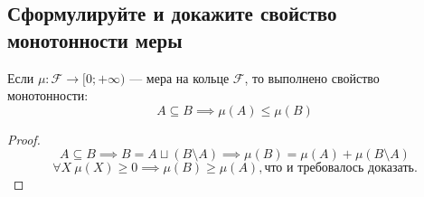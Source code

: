 
\subsection{Сформулируйте и докажите свойство монотонности меры}

Если $\mu : \mathcal{F} \to [0; +\infty)$ --- мера на кольце $\mathcal{F}$, то выполнено свойство монотонности:
\[ A \subseteq B \implies \mu(A) \le \mu(B) \]
\begin{proof}
    \[ A \subseteq B \implies B = A \sqcup (B \setminus A) \implies \mu(B) = \mu(A) + \mu(B \setminus A) \]
    \[ \forall X\: \mu(X) \ge 0 \implies \mu(B) \ge \mu(A), \text{что и требовалось доказать}. \]
\end{proof}
